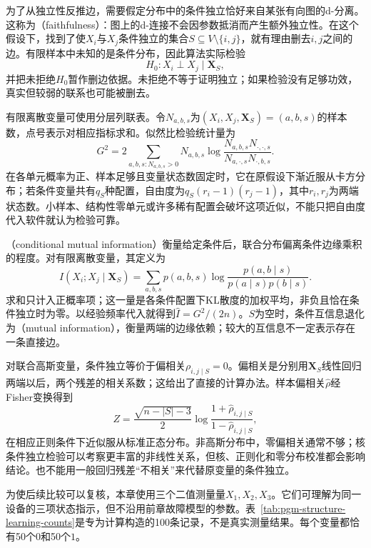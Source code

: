 为了从独立性反推边，需要假定分布中的条件独立恰好来自某张有向图的d-分离。这称为（faithfulness）：图上的d-连接不会因参数抵消而产生额外独立性。在这个假设下，找到了使$X_i$与$X_j$条件独立的集合$S\subseteq V\setminus\{i,j\}$，就有理由删去$i,j$之间的边。有限样本中未知的是条件分布，因此算法实际检验
\[
  H_0:X_i\perp X_j\mid\bm{X}_S,
\]
并把未拒绝$H_0$暂作删边依据。未拒绝不等于证明独立；如果检验没有足够功效，真实但较弱的联系也可能被删去。

有限离散变量可使用分层列联表。令$N_{a,b,s}$为$(X_i,X_j,\bm{X}_S)=(a,b,s)$的样本数，点号表示对相应指标求和。似然比检验统计量为
\begin{equation}
  G^2=2\sum_{a,b,s:N_{a,b,s}>0}
  N_{a,b,s}\log
  \frac{N_{a,b,s}N_{\cdot,\cdot,s}}
       {N_{a,\cdot,s}N_{\cdot,b,s}}.
  \label{eq:pgm-structure-learning-g-test}
\end{equation}
在各单元概率为正、样本足够且变量状态数固定时，它在原假设下渐近服从卡方分布；若条件变量共有$q_S$种配置，自由度为$q_S(r_i-1)(r_j-1)$，其中$r_i,r_j$为两端状态数。小样本、结构性零单元或许多稀有配置会破坏这项近似，不能只把自由度代入软件就认为检验可靠。

（conditional mutual information）衡量给定条件后，联合分布偏离条件边缘乘积的程度。对有限离散变量，其定义为
\[
  I(X_i;X_j\mid\bm{X}_S)
  =\sum_{a,b,s}p(a,b,s)
       \log\frac{p(a,b\mid s)}{p(a\mid s)p(b\mid s)}.
\]
求和只计入正概率项；这一量是各条件配置下KL散度的加权平均，非负且恰在条件独立时为零。以经验频率代入就得到$\widehat I=G^2/(2n)$。$S$为空时，条件互信息退化为（mutual information），衡量两端的边缘依赖；较大的互信息不一定表示存在一条直接边。

对联合高斯变量，条件独立等价于偏相关$\rho_{i,j\mid S}=0$。偏相关是分别用$\bm{X}_S$线性回归两端以后，两个残差的相关系数；这给出了直接的计算办法。样本偏相关$\widehat\rho$经Fisher变换得到
\[
  Z=\frac{\sqrt{n-|S|-3}}{2}
    \log\frac{1+\widehat\rho_{i,j\mid S}}
                  {1-\widehat\rho_{i,j\mid S}},
\]
在相应正则条件下近似服从标准正态分布。非高斯分布中，零偏相关通常不够；核条件独立检验可以考察更丰富的非线性关系，但核、正则化和零分布校准都会影响结论。也不能用一般回归残差“不相关”来代替原变量的条件独立。

为使后续比较可以复核，本章使用三个二值测量量$X_1,X_2,X_3$。它们可理解为同一设备的三项状态指示，但不沿用前章故障模型的参数。表~\ref{tab:pgm-structure-learning-counts}是专为计算构造的100条记录，不是真实测量结果。每个变量都恰有50个$0$和50个$1$。

